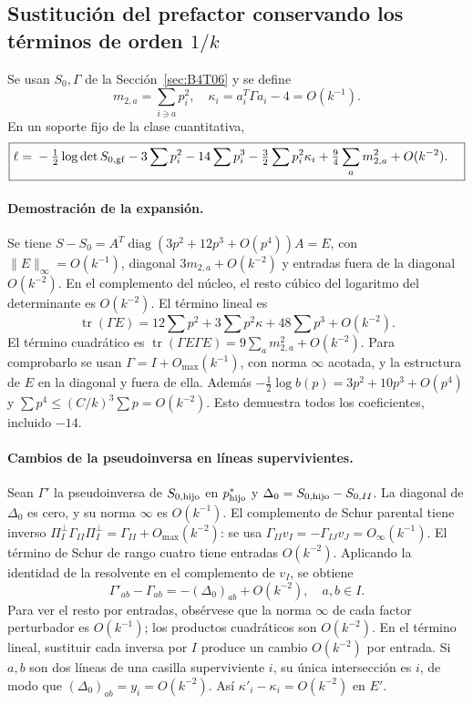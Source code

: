 \subsection{Sustitución del prefactor conservando los términos de orden
\texorpdfstring{$1/k$}{1/k}}\label{sec:B4T07}
Se usan $S_0,\Gamma$ de la Sección~\ref{sec:B4T06} y se define
\[
 m_{2,a}=\sum_{i\ni a}p_i^2,\quad
 \kappa_i=a_i^T\Gamma a_i-4=O(k^{-1}).
\]
En un soporte fijo de la clase cuantitativa,
\begin{equation}\label{eq:ell-exp}
 \boxed{\begin{aligned}
 \ell={}&-\tfrac12\log\det S_{0,\rm gf}-3\sum p_i^2-14\sum p_i^3
 -\tfrac32\sum p_i^2\kappa_i
 +\tfrac94\sum_a m_{2,a}^2+O(k^{-2}).
 \end{aligned}}
\end{equation}
\paragraph{Demostración de la expansión.}
Se tiene $S-S_0=A^T\operatorname{diag}(3p^2+12p^3+O(p^4))A=E$,
con $\|E\|_\infty=O(k^{-1})$, diagonal $3m_{2,a}+O(k^{-2})$
y entradas fuera de la diagonal $O(k^{-2})$.
En el complemento del núcleo, el resto cúbico del logaritmo del determinante es $O(k^{-2})$.
El término lineal es
\[
 \operatorname{tr}(\Gamma E)=12\sum p^2+
 3\sum p^2\kappa+48\sum p^3+O(k^{-2}).
\]
El término cuadrático es
$\operatorname{tr}(\Gamma E\Gamma E)=9\sum_a m_{2,a}^2+O(k^{-2})$.
Para comprobarlo se usan $\Gamma=I+O_{\max}(k^{-1})$, con norma $\infty$
acotada, y la estructura de $E$ en la diagonal y fuera de ella.
Además $-\tfrac12\log b(p)=3p^2+10p^3+O(p^4)$ y
$\sum p^4\le(C/k)^3\sum p=O(k^{-2})$.
Esto demuestra todos los coeficientes, incluido $-14$.

\paragraph{Cambios de la pseudoinversa en líneas supervivientes.}
Sean $\Gamma'$ la pseudoinversa de $S_{0,\rm hijo}$ en $p^*_{\rm hijo}$ y
$\Delta_0=S_{0,\rm hijo}-S_{0,II}$.
La diagonal de $\Delta_0$ es cero, y su norma $\infty$ es $O(k^{-1})$.
El complemento de Schur parental tiene inverso
$\Pi_I^\perp\Gamma_{II}\Pi_I^\perp=\Gamma_{II}+O_{\max}(k^{-2})$:
se usa $\Gamma_{II}v_I=-\Gamma_{IJ}v_J=O_\infty(k^{-1})$.
El término de Schur de rango cuatro tiene entradas $O(k^{-2})$.
Aplicando la identidad de la resolvente en el complemento de $v_I$, se obtiene
\[
 \boxed{\Gamma'_{ab}-\Gamma_{ab}=-(\Delta_0)_{ab}+O(k^{-2}),\quad a,b\in I.}
\]
Para ver el resto por entradas, obsérvese que la norma $\infty$ de cada factor
perturbador es $O(k^{-1})$; los productos cuadráticos son $O(k^{-2})$.
En el término lineal, sustituir cada inversa por $I$ produce un cambio $O(k^{-2})$ por entrada.
Si $a,b$ son dos líneas de una casilla superviviente $i$, su única
intersección es $i$, de modo que $(\Delta_0)_{ab}=y_i=O(k^{-2})$.
Así $\kappa'_i-\kappa_i=O(k^{-2})$ en $E'$.

